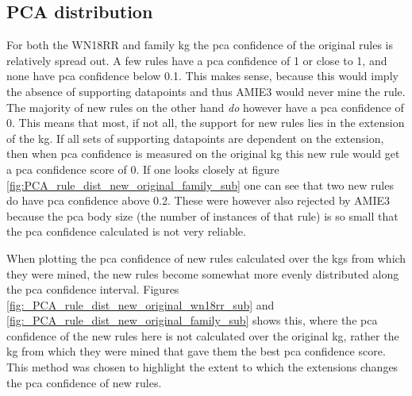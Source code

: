 \subsection{PCA distribution}
For both the WN18RR and family \gls{kg} the \gls{pca} confidence of the original rules is relatively spread out. A few rules have a \gls{pca} confidence of 1 or close to 1, and none have \gls{pca} confidence below 0.1. This makes sense, because this would imply the absence of supporting datapoints and thus AMIE3 would never mine the rule. The majority of new rules on the other hand \textit{do} however have a \gls{pca} confidence of 0. This means that most, if not all, the support for new rules lies in the extension of the \gls{kg}. If all sets of supporting datapoints are dependent on the extension, then when \gls{pca} confidence is measured on the original \gls{kg} this new rule would get a \gls{pca} confidence score of 0. If one looks closely at figure \ref{fig:PCA_rule_dist_new_original_family_sub} one can see that two new rules do have \gls{pca} confidence above 0.2. These were however also rejected by AMIE3 because the \gls{pca} body size (the number of instances of that rule) is so small that the \gls{pca} confidence calculated is not very reliable.

When plotting the \gls{pca} confidence of new rules calculated over the \glspl{kg} from which they were mined, the new rules become somewhat more evenly distributed along the \gls{pca} confidence interval. Figures \ref{fig:_PCA_rule_dist_new_original_wn18rr_sub} and \ref{fig:_PCA_rule_dist_new_original_family_sub} shows this, where the \gls{pca} confidence of the new rules here is not calculated over the original \gls{kg}, rather the \gls{kg} from which they were mined that gave them the best \gls{pca} confidence score. This method was chosen to highlight the extent to which the extensions changes the \gls{pca} confidence of new rules.

